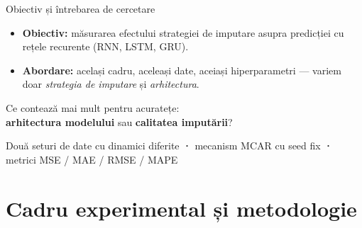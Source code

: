 \documentclass[aspectratio=169, 11pt]{beamer}
\begin{document}
\begin{frame}{Obiectiv și întrebarea de cercetare}
  \begin{itemize}
    \item \textbf{Obiectiv:} măsurarea efectului strategiei de imputare asupra predicției cu rețele recurente (RNN, LSTM, GRU).
    \item \textbf{Abordare:} același cadru, aceleași date, aceiași hiperparametri — variem doar \textit{strategia de imputare} și \textit{arhitectura}.
  \end{itemize}
  \vfill
  \begin{keybox}
    \centering\large
    Ce contează mai mult pentru acuratețe:\\
    \textbf{arhitectura modelului} sau \textbf{calitatea imputării}?
  \end{keybox}
  \vfill
  \centering\footnotesize\color{primary}
  Două seturi de date cu dinamici diferite \textbf{·} mecanism MCAR cu seed fix \textbf{·} metrici MSE / MAE / RMSE / MAPE
\end{frame}

\section{Cadru experimental și metodologie}
\end{document}
